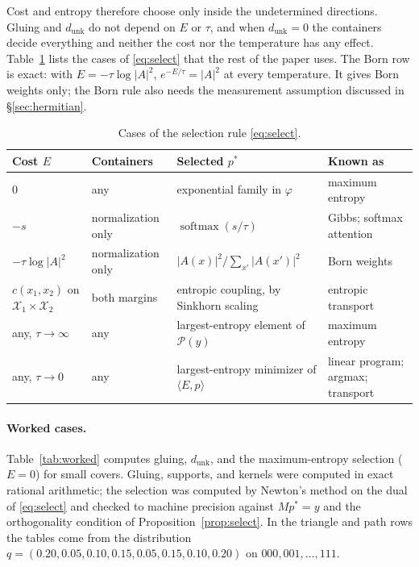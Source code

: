 \documentclass[11pt]{article}
\theoremstyle{boldplain}
\theoremstyle{boldupright}
\newcommand{\Xs}{\mathcal{X}}
\newcommand{\Pc}{\mathcal{P}}
\newcommand{\dunk}{d_{\mathrm{unk}}}
\begin{document}
Cost and entropy therefore choose only inside the undetermined directions. Gluing and $\dunk$ do not
depend on $E$ or $\tau$, and when $\dunk=0$ the containers decide everything and neither the cost nor the
temperature has any effect. Table~\ref{tab:cases} lists the cases of \eqref{eq:select} that the rest of the paper uses. The Born
row is exact: with $E=-\tau\log|A|^2$, $e^{-E/\tau}=|A|^2$ at every temperature. It gives Born weights only; the Born
rule also needs the measurement assumption discussed in \S\ref{sec:hermitian}.

\begin{table}[t]
\centering\small
\begin{tabularx}{\textwidth}{@{}l l >{\raggedright}X >{\raggedright\arraybackslash}p{1.55in}@{}}
\toprule
Cost $E$ & Containers & Selected $p^*$ & Known as\\
\midrule
$0$ & any & exponential family in $\varphi$ & maximum entropy \cite{jaynes1957}\\
$-s$ & normalization only & $\operatorname{softmax}(s/\tau)$ & Gibbs; softmax attention \cite{vaswani2017}\\
$-\tau\log|A|^2$ & normalization only & $|A(x)|^2/\sum_{x'}|A(x')|^2$ & Born weights\\
$c(x_1,x_2)$ on $\Xs_1\times\Xs_2$ & both margins & entropic coupling, by Sinkhorn scaling & entropic transport \cite{cuturi2013}\\
any, $\tau\to\infty$ & any & largest-entropy element of $\Pc(y)$ & maximum entropy\\
any, $\tau\to0$ & any & largest-entropy minimizer of $\langle E,p\rangle$ & linear program; argmax; transport \cite{peyre2019}\\
\bottomrule
\end{tabularx}
\caption{Cases of the selection rule \eqref{eq:select}.}
\label{tab:cases}
\end{table}

\paragraph{Worked cases.} Table~\ref{tab:worked} computes gluing, $\dunk$, and the maximum-entropy selection ($E=0$) for
small covers. Gluing, supports, and kernels were computed in exact rational arithmetic; the selection
was computed by Newton's method on the dual of \eqref{eq:select} and checked to machine precision against
$Mp^*=y$ and the orthogonality condition of Proposition~\ref{prop:select}. In the triangle and path rows the tables
come from the distribution $q=(0.20,0.05,0.10,0.15,0.05,0.15,0.10,0.20)$ on $000,001,\dots,111$.
\end{document}
